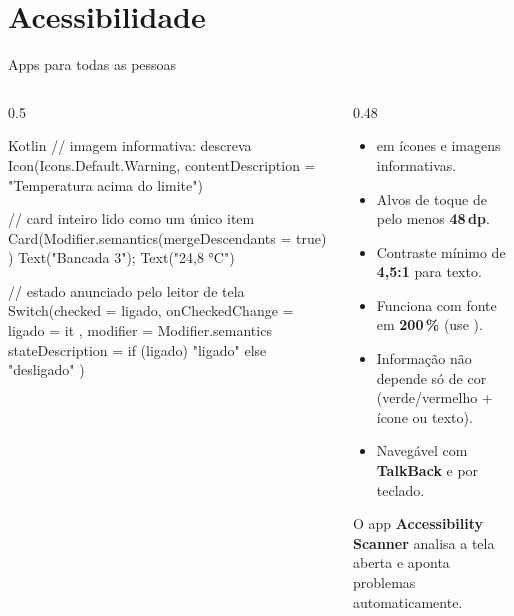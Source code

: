 \documentclass[aspectratio=169,10pt]{beamer}
\begin{document}
\section{Acessibilidade}

\begin{frame}[fragile]{Apps para todas as pessoas}
  \begin{columns}[T]
    \begin{column}{0.5\textwidth}
\begin{codigo}[title=Semântica em Compose]{Kotlin}
// imagem informativa: descreva
Icon(Icons.Default.Warning,
  contentDescription = "Temperatura acima do limite")

// card inteiro lido como um único item
Card(Modifier.semantics(mergeDescendants = true) {}) {
  Text("Bancada 3"); Text("24,8 °C")
}

// estado anunciado pelo leitor de tela
Switch(checked = ligado, onCheckedChange = { ligado = it },
  modifier = Modifier.semantics {
    stateDescription = if (ligado) "ligado" else "desligado"
  })
\end{codigo}
    \end{column}
    \begin{column}{0.48\textwidth}
      \begin{conceito}[Checklist]
        \begin{itemize}
          \item {} em ícones e imagens informativas.
          \item Alvos de toque de pelo menos \textbf{48\,dp}.
          \item Contraste mínimo de \textbf{4,5:1} para texto.
          \item Funciona com fonte em \textbf{200\,\%} (use ).
          \item Informação não depende só de cor (verde/vermelho + ícone ou texto).
          \item Navegável com \textbf{TalkBack} e por teclado.
        \end{itemize}
      \end{conceito}
      \begin{dica}
        O app \textbf{Accessibility Scanner} analisa a tela aberta e aponta problemas automaticamente.
      \end{dica}
    \end{column}
  \end{columns}
\end{frame}
\end{document}
